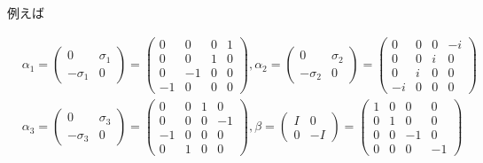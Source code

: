 \documentclass[a4paper,11pt]{jsarticle}
\numberwithin{equation}{section}
\begin{document}
例えば

\begin{equation}
  \begin{aligned}
    &\alpha_1 = \left(
      \begin{array}{cc}
        0 & \sigma_1 \\
        -\sigma_1 & 0 
      \end{array}
      \right)
    = \left(
      \begin{array}{cccc}
        0 & 0 & 0 & 1 \\
        0 & 0 & 1 & 0 \\
        0 &-1 & 0 & 0 \\
      -1 & 0 & 0 & 0
      \end{array}
      \right),　
    \alpha_2 = \left(
      \begin{array}{cc}
        0 & \sigma_2 \\
        -\sigma_2 & 0 
      \end{array}
      \right)
    = \left(
      \begin{array}{cccc}
        0 & 0 & 0 & -i\\
        0 & 0 & i & 0 \\
        0 & i & 0 & 0 \\
       -i & 0 & 0 & 0
      \end{array}
      \right)\\
    &\alpha_3 = \left(
        \begin{array}{cc}
          0 & \sigma_3 \\
          -\sigma_3 & 0 
        \end{array}
        \right)
      = \left(
        \begin{array}{cccc}
          0 & 0 & 1 & 0 \\
          0 & 0 & 0 & -1\\
         -1 & 0 & 0 & 0 \\
          0 & 1 & 0 & 0
        \end{array}
        \right),　
      \beta = \left(
        \begin{array}{cc}
          I & 0 \\
          0 & -I 
        \end{array}
        \right)
      = \left(
        \begin{array}{cccc}
          1 & 0 & 0 & 0 \\
          0 & 1 & 0 & 0 \\
          0 & 0 &-1 & 0 \\
          0 & 0 & 0 &-1
        \end{array}
        \right)
  \end{aligned}
\label{ディラック表示}
\end{equation}
\end{document}

